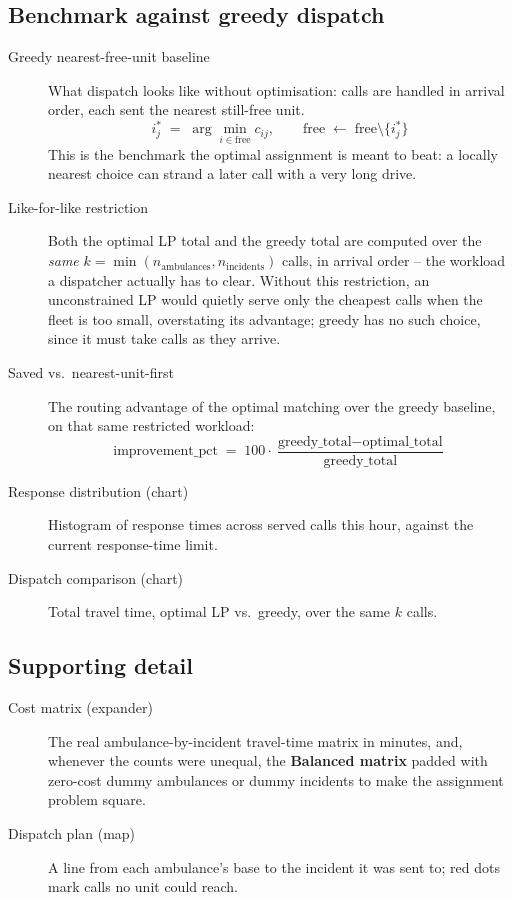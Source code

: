 \documentclass[11pt]{article}
\begin{document}
\subsection{Benchmark against greedy dispatch}
\begin{description}
  \item[Greedy nearest-free-unit baseline] What dispatch looks like without
    optimisation: calls are handled in arrival order, each sent the nearest
    still-free unit.
    \[
      i^*_j \;=\; \arg\min_{i \in \text{free}} c_{ij}, \qquad
      \text{free} \;\leftarrow\; \text{free}\setminus\{i^*_j\}
    \]
    This is the benchmark the optimal assignment is meant to beat: a locally
    nearest choice can strand a later call with a very long drive.
  \item[Like-for-like restriction] Both the optimal LP total and the greedy
    total are computed over the \emph{same} $k = \min(n_{\text{ambulances}},
    n_{\text{incidents}})$ calls, in arrival order -- the workload a
    dispatcher actually has to clear. Without this restriction, an
    unconstrained LP would quietly serve only the cheapest calls when the
    fleet is too small, overstating its advantage; greedy has no such choice,
    since it must take calls as they arrive.
  \item[Saved vs.\ nearest-unit-first] The routing advantage of the optimal
    matching over the greedy baseline, on that same restricted workload:
    \[
      \text{improvement\_pct} \;=\; 100\cdot
      \frac{\text{greedy\_total} - \text{optimal\_total}}{\text{greedy\_total}}
    \]
  \item[Response distribution (chart)] Histogram of response times across
    served calls this hour, against the current response-time limit.
  \item[Dispatch comparison (chart)] Total travel time, optimal LP vs.\
    greedy, over the same $k$ calls.
\end{description}

\subsection{Supporting detail}
\begin{description}
  \item[Cost matrix (expander)] The real ambulance-by-incident travel-time
    matrix in minutes, and, whenever the counts were unequal, the
    \textbf{Balanced matrix} padded with zero-cost dummy ambulances or dummy
    incidents to make the assignment problem square.
  \item[Dispatch plan (map)] A line from each ambulance's base to the
    incident it was sent to; red dots mark calls no unit could reach.
\end{description}
\end{document}
